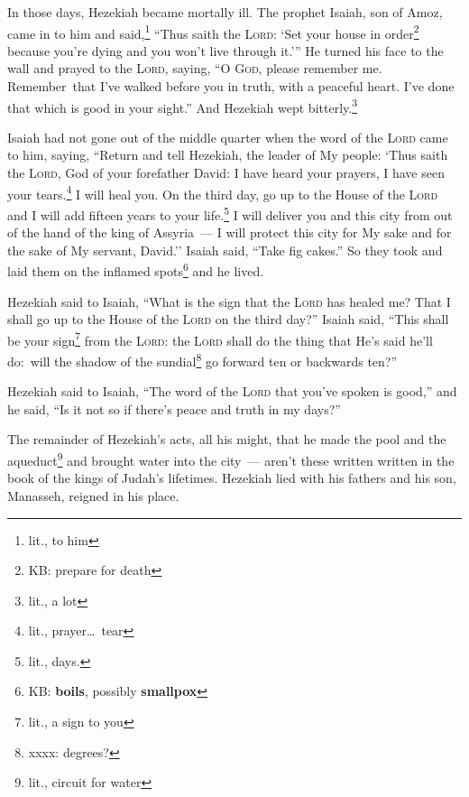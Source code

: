 
\begin{inparaenum}
     In those days, Hezekiah became mortally ill. The prophet Isaiah, son of Amoz, came in to him and said,\footnote{lit., to him} ``Thus saith the \textsc{Lord}: `Set your house in order\footnote{KB: prepare for death} because you're dying and you won't live through it.'\thinspace''%
     He turned his face to the wall and prayed to the \textsc{Lord}, saying,%
     ``O \textsc{God}, please remember me. Remember\understood\ that I've walked before you in truth, with a peaceful heart. I've done that which is good in your sight.'' And Hezekiah wept bitterly.\footnote{lit., a lot}%
    
     Isaiah had not gone out of the middle quarter when the word of the \textsc{Lord} came to him, saying,%
     ``Return and tell Hezekiah, the leader of My people: `Thus saith the \textsc{Lord}, God of your forefather David: I have heard your prayers, I have seen your tears.\footnote{lit., prayer\dots\ tear} I will heal you. On the third day, go up to the House of the \textsc{Lord}%
     and I will add fifteen years to your life.\footnote{lit., days.} I will deliver you and this city from out of the hand of the king of Assyria~--- I will protect this city for My sake and for the sake of My servant, David.''%
     Isaiah said, ``Take fig cakes.'' So they took and laid them on the inflamed spots\footnote{KB: \textbf{boils}, possibly \textbf{smallpox}} and he lived.%
    
     Hezekiah said to Isaiah, ``What is the sign that the \textsc{Lord} has healed me? That I shall go up to the House of the \textsc{Lord} on the third day?''%
     Isaiah said, ``This shall be your sign\footnote{lit., a sign to you} from the \textsc{Lord}: the \textsc{Lord} shall do the thing that He's said he'll do:\understood\ will the shadow of the sundial\footnote{xxxx: degrees?} go forward ten or backwards ten?''%
    
    
     Hezekiah said to Isaiah, ``The word of the \textsc{Lord} that you've spoken is good,'' and he said, ``Is it not so if there's peace and truth in my days?''%
    
     The remainder of Hezekiah's acts, all his might, that he made the pool and the aqueduct\footnote{lit., circuit for water} and brought water into the city~--- aren't these written written in the book of the kings of Judah's lifetimes.%
     Hezekiah lied with his fathers and his son, Manasseh, reigned in his place.%
\end{inparaenum}
